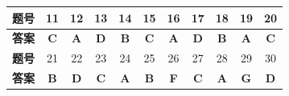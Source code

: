 \documentclass[UTF8, zihao=5, a4paper, fontset=fandol]{ctexart}
\begin{document}

\begin{center}
\renewcommand{\arraystretch}{1.35}
\begin{tabular}{|c|c|c|c|c|c|c|c|c|c|c|}
\hline
\textbf{题号} & 11 & 12 & 13 & 14 & 15 & 16 & 17 & 18 & 19 & 20 \\
\hline
\textbf{答案} & \textbf{C} & \textbf{A} & \textbf{D} & \textbf{B} & \textbf{C} & \textbf{A} & \textbf{D} & \textbf{B} & \textbf{A} & \textbf{C} \\
\hline
\textbf{题号} & 21 & 22 & 23 & 24 & 25 & 26 & 27 & 28 & 29 & 30 \\
\hline
\textbf{答案} & \textbf{B} & \textbf{D} & \textbf{C} & \textbf{A} & \textbf{B} & \textbf{F} & \textbf{C} & \textbf{A} & \textbf{G} & \textbf{D} \\
\hline
\end{tabular}
\end{center}
\end{document}
